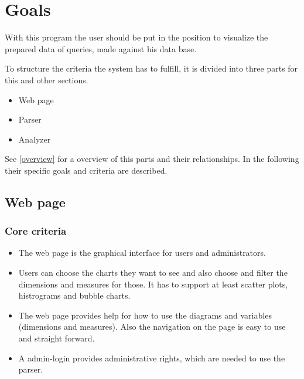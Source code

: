 \section{Goals}


With this program the user should be put in the position 
to visualize the prepared data of queries, made against his data base.


To structure the criteria the system has to fulfill, 
it is divided into three parts for this and other sections.
\begin{itemize}
  \item Web page
  \item Parser
  \item Analyzer
\end{itemize}
See \ref{overview} for a overview of this parts and their relationships.
In the following their specific goals and criteria are described.
 

% 


\subsection{Web page}
\subsubsection{Core criteria}
\begin{itemize}
\item The web page is the graphical interface for users and administrators. 

\item Users can choose the charts they want to see 
and also choose and filter the dimensions and measures for those. 
It has to support at least scatter plots, histrograms and bubble charts.

\item The web page provides help for how to use the diagrams and variables (dimensions 
and measures). 
Also the navigation on the page is easy to use and straight forward.

\item A admin-login provides administrative rights, which are needed to use the parser.
\end{itemize}

